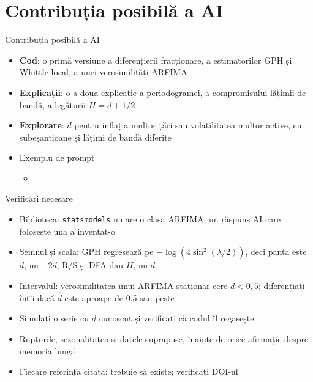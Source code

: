 \section{Contribuția posibilă a AI}

\begin{frame}{Contribuția posibilă a AI}
\itemsize{\small}
\begin{itemize}
    \item \textbf{Cod}: o primă versiune a diferențierii fracționare, a estimatorilor GPH și Whittle local, a unei verosimilități ARFIMA
    \item \textbf{Explicații}: o a doua explicație a periodogramei, a compromisului lățimii de bandă, a legăturii $H = d + 1/2$
    \item \textbf{Explorare}: $d$ pentru inflația multor țări sau volatilitatea multor active, cu subeșantioane și lățimi de bandă diferite
    \item Exemplu de prompt
    \begin{itemize}
        \item {}
    \end{itemize}
\end{itemize}
\end{frame}

\begin{frame}{Verificări necesare}
\itemsize{\small}
\begin{itemize}
    \item Biblioteca: \texttt{statsmodels} nu are o clasă ARFIMA; un răspuns AI care folosește una a inventat-o
    \item Semnul și scala: GPH regresează pe $-\log(4\sin^2(\lambda/2))$, deci panta este $d$, nu $-2d$; R/S și DFA dau $H$, nu $d$
    \item Intervalul: verosimilitatea unui ARFIMA staționar cere $d < 0{,}5$; diferențiați întîi dacă $\hat d$ este aproape de 0,5 sau peste
    \item Simulați o serie cu $d$ cunoscut și verificați că codul îl regăsește
    \item Rupturile, sezonalitatea și datele suprapuse, înainte de orice afirmație despre memoria lungă
    \item Fiecare referință citată: trebuie să existe; verificați DOI-ul
\end{itemize}
\end{frame}


